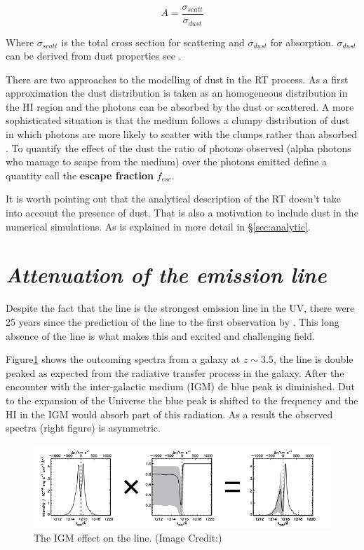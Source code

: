 \begin{equation}
A = \dfrac{\sigma_{scatt}}{\sigma_{dust}}
\end{equation}

Where $\sigma_{scatt}$ is the total cross section for scattering 
and $\sigma_{dust}$ for absorption. $\sigma_{dust}$ can be derived from 
dust properties see \citep{Laursen09}. 

There are two approaches to the modelling of dust in the \ly RT process.
As a first approximation the dust distribution is taken as an homogeneous distribution 
in the HI region and 
the \ly photons can be absorbed by the dust or scattered. A more
sophisticated situation is that the medium follows a clumpy distribution
of dust in which \ly photons are more likely to scatter with the 
clumps rather than absorbed \citep{Laursen13}. To quantify the effect of 
the dust the ratio
of \ly photons observed (\ly alpha photons who manage to scape from the medium) 
over the \ly photons emitted define a quantity call the {\bf{escape fraction}} $f_{esc}$. 

It is worth pointing out that the analytical
description of the \ly RT doesn't take into account the presence of
dust. That is also a motivation to include dust in the numerical simulations.
As is explained in more detail in \S \ref{sec:analytic}.  





\section{\emph{Attenuation of the \ly emission line}}

Despite the fact that the \ly line is the strongest emission line in 
the UV, there were 25 years since the prediction of the \ly line to 
the first observation by \citep{DjorgovskiThomson92}. 
This long absence of the \ly line is what makes this and excited and 
challenging field.

Figure\ref{fig:IGM} shows the outcoming spectra from a galaxy 
at $z \sim 3.5$, the line is double peaked as expected from 
the radiative transfer process in the galaxy. After the encounter
with the inter-galactic medium (IGM) de blue peak is diminished.
Dut to the expansion of the Universe the blue peak 
is shifted to the \ly frequency and the HI in the IGM would absorb
part of this radiation. As a result the observed spectra (right figure)
is asymmetric.   

\begin{figure}[H]
\begin{center}
\includegraphics[scale=0.6]{Figures/ISM.png}
\end{center}\caption{The IGM effect on the \ly line. (Image Credit:)\label{fig:IGM}}
\end{figure}


